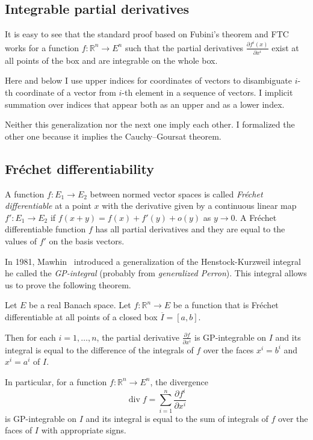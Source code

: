 \documentclass[a4paper, UKenglish,cleveref, autoref, thm-restate]{lipics-v2021}
\newcommand{\bbR}{\mathbb{R}}
\DeclareMathOperator{\divg}{div}
\begin{document}
\subsection{Integrable partial derivatives}
It is easy to see that the standard proof based on Fubini's theorem
and FTC works for a function \(f\colon \bbR^{n}\to E^{n}\) such that
the partial derivatives \(\frac{\partial f^{i}(x)}{\partial x^{i}}\)
exist at all points of the box and are integrable on the whole
box.

\begin{remark}
  Here and below I use upper indices for coordinates of vectors to
  disambiguate \(i\)-th coordinate of a vector from \(i\)-th element
  in a sequence of vectors. I  implicit
  summation over indices that appear both as an upper and as a lower
  index.
\end{remark}

Neither this generalization nor the next one imply each other. I
formalized the other one because it implies the Cauchy--Goursat theorem.

\subsection{Fréchet differentiability}
A function \(f\colon E_{1}\to E_{2}\) between normed vector spaces is
called \emph{Fréchet differentiable} at a point \(x\) with the
derivative given by a continuous linear map
\(f'\colon E_{1}\to E_{2}\) if \(f(x+y)=f(x)+f'(y)+o(y)\) as
\(y\to 0\). A Fréchet differentiable function \(f\) has all partial
derivatives and they are equal to the values of \(f'\) on the basis
vectors.

In 1981, Mawhin~\cite{Mawhin81} introduced a generalization of the
Henstock-Kurzweil integral he called the \emph{GP-integral} (probably
from \emph{generalized Perron}). This integral allows us to prove the
following theorem.

\begin{theorem}%
  [see~\cite{Mawhin81}]%
  \label{thm:divergence}
  Let \(E\) be a real Banach space. Let \(f\colon \bbR^{n}\to E\) be a
  function that is Fréchet differentiable at all points of a closed
  box \(\overline I=[a, b]\).

  Then for each \(i=1,\dots,n\), the partial derivative
  \(\frac{\partial f}{\partial x^{i}}\) is GP-integrable on \(I\) and
  its integral is equal to the difference of the integrals of \(f\) over
  the faces \(x^{i}=b^{i}\) and \(x^{i}=a^{i}\) of \(I\).

  In particular, for a function \(f\colon \bbR^{n}\to E^{n}\), the
  divergence
  \begin{equation}
    \label{eq:divg}
    \divg f=\sum_{i=1}^{n}\frac{\partial f^{i}}{\partial x^{i}}
  \end{equation}
  is GP-integrable on \(I\) and its integral is equal to the sum of
  integrals of \(f\) over the faces of \(I\) with appropriate signs.
\end{theorem}
\end{document}
